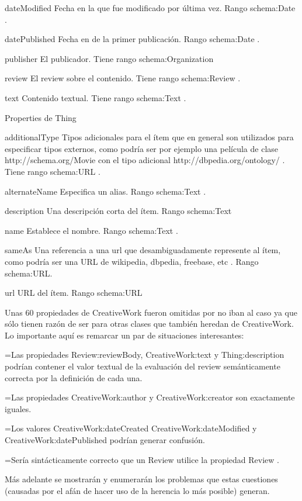 dateModified 	Fecha en la que fue modificado por última vez. Rango schema:Date .

datePublished 	Fecha en de la primer publicación. Rango schema:Date .

publisher 	El publicador. Tiene rango schema:Organization

review 	 	El review sobre el contenido. Tiene rango schema:Review .

text 		Contenido textual. Tiene rango schema:Text .


Properties de Thing

additionalType 	 Tipos adicionales para el ítem que en general son utilizados para especificar tipos externos, como podría ser por ejemplo una película de clase http://schema.org/Movie con el tipo adicional  http://dbpedia.org/ontology/ . Tiene rango schema:URL .

alternateName 	 Especifica un alias. Rango schema:Text .

description 	Una descripción corta del ítem. Rango schema:Text 

name 		Establece el nombre. Rango schema:Text .

sameAs 		Una referencia a una url que desambiguadamente represente al ítem, como podría ser una URL de wikipedia, dbpedia, freebase, etc . Rango schema:URL.

url 		URL del ítem. Rango schema:URL

Unas 60 propiedades de CreativeWork fueron omitidas por no iban al caso ya que sólo tienen razón de ser para otras clases que 
también heredan de CreativeWork. Lo importante aquí es remarcar un par de situaciones interesantes:

=Las propiedades Review:reviewBody, CreativeWork:text y Thing:description podrían contener el valor textual de la evaluación del review semánticamente correcta por la definición de cada una.

=Las propiedades CreativeWork:author y CreativeWork:creator son exactamente iguales. 

=Los valores CreativeWork:dateCreated CreativeWork:dateModified y CreativeWork:datePublished podrían generar confusión. 

=Sería sintácticamente correcto que un Review utilice la propiedad Review .

Más adelante se mostrarán y enumerarán los problemas que estas cuestiones (causadas por el afán de hacer uso de la herencia
lo más posible)  generan. 



